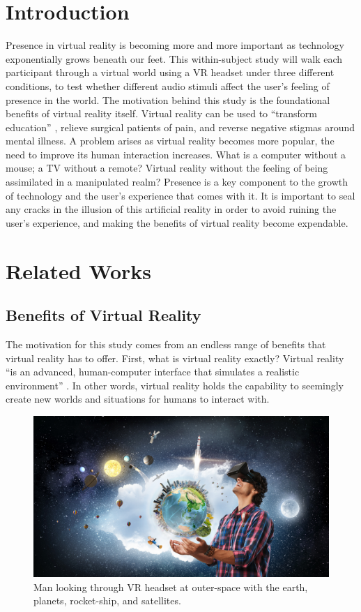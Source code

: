 \documentclass[manuscript,screen,review]{acmart}
\begin{document}
\section{Introduction}
Presence in virtual reality is becoming more and more important as technology exponentially grows beneath our feet. This within-subject study will walk each participant through a virtual world using a VR headset under three different conditions, to test whether different audio stimuli affect the user's feeling of presence in the world. The motivation behind this study is the foundational benefits of virtual reality itself. Virtual reality can be used to “transform education” \cite{SMITH}, relieve surgical patients of pain, and reverse negative stigmas around mental illness. A problem arises as virtual reality becomes more popular, the need to improve its human interaction increases. What is a computer without a mouse; a TV without a remote? Virtual reality without the feeling of being assimilated in a manipulated realm? Presence is a key component to the growth of technology and the user’s experience that comes with it. It is important to seal any cracks in the illusion \cite{CARTER} of this artificial reality in order to avoid ruining the user’s experience, and making the benefits of virtual reality become expendable.  
  

\section{Related Works}

\subsection{Benefits of Virtual Reality}
The motivation for this study comes from an endless range of benefits that virtual reality has to offer. First, what is virtual reality exactly? Virtual reality “is an advanced, human-computer interface that simulates a realistic environment” \cite{Zheng}. In other words, virtual reality holds the capability to seemingly create new worlds and situations for humans to interact with. 

\begin{figure}[ht]
  \centering
  \includegraphics[width=\linewidth]{Virtual_Reality.jpg}
  \caption{Man looking through VR headset at outer-space with the earth, planets, rocket-ship, and satellites. \cite{LYNXPRO}}
\end{figure}
\end{document}
